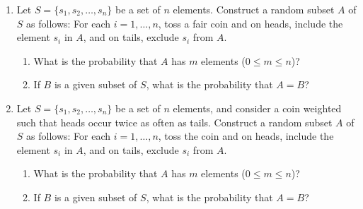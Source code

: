 \documentclass[svgnames]{amsart}
\begin{document}
\begin{enumerate}
\item Let $S = \{s_1, s_2, \ldots, s_n\}$ be a set of $n$ elements. Construct a random subset $A$ of $S$ as follows: For each $i = 1, \ldots, n$, toss a fair coin and on heads, include the element $s_i$ in $A$, and on tails, exclude $s_i$ from $A$.
\begin{enumerate}
	\item What is the probability that $A$ has $m$ elements ($0 \le m \le n$)?
	\item If $B$ is a given subset of $S$, what is the probability that $A = B$?
\end{enumerate}

\item Let $S = \{s_1, s_2, \ldots, s_n\}$ be a set of $n$ elements, and consider a coin weighted such that heads occur twice as often as tails. Construct a random subset $A$ of $S$ as follows: For each $i = 1, \ldots, n$, toss the coin and on heads, include the element $s_i$ in $A$, and on tails, exclude $s_i$ from $A$.
\begin{enumerate}
	\item What is the probability that $A$ has $m$ elements ($0 \le m \le n$)?
	\item If $B$ is a given subset of $S$, what is the probability that $A = B$?
\end{enumerate}

\end{enumerate} %
\end{document}
